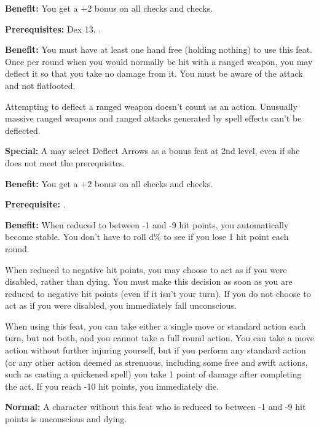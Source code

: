 
\textbf{Benefit:} You get a +2 bonus on all  checks and  checks.


\textbf{Prerequisites:} Dex 13, .

\textbf{Benefit:} You must have at least one hand free (holding nothing) to use 
this feat. Once per round when you would normally be hit with a ranged weapon, 
you may deflect it so that you take no damage from it. You must be aware of the 
attack and not flatfooted.

Attempting to deflect a ranged weapon doesn't count as an action. Unusually massive 
ranged weapons and ranged attacks generated by spell effects can't be deflected.

\textbf{Special:} A  may select Deflect Arrows as a bonus feat at 2nd level, 
even if she does not meet the prerequisites.


\textbf{Benefit:} You get a +2 bonus on all  checks and  
checks.


\textbf{Prerequisite:} .

\textbf{Benefit:} When reduced to between -1 and -9 hit points, you automatically 
become stable. You don't have to roll d\% to see if you lose 1 hit point each round.

When reduced to negative hit points, you may choose to act as if you were disabled, 
rather than dying. You must make this decision as soon as you are reduced to negative 
hit points (even if it isn't your turn). If you do not choose to act as if you 
were disabled, you immediately fall unconscious.

When using this feat, you can take either a single move or standard action each 
turn, but not both, and you cannot take a full round action. You can take a move 
action without further injuring yourself, but if you perform any standard action 
(or any other action deemed as strenuous, including some free and swift actions, such as 
casting a quickened spell) you take 1 point of damage after completing the act. 
If you reach -10 hit points, you immediately die.

\textbf{Normal:} A character without this feat who is reduced to between -1 and 
-9 hit points is unconscious and dying.

